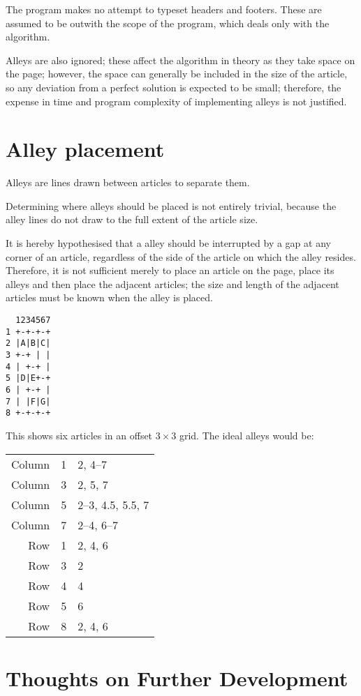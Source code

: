 \documentclass[a4paper]{scrartcl}
\begin{document}
The program makes no attempt to typeset headers and footers. These are
assumed to be outwith the scope of the program, which deals only with
the algorithm.

Alleys are also ignored; these affect the algorithm in theory as they
take space on the page; however, the space can generally be included
in the size of the article, so any deviation from a perfect solution is
expected to be small; therefore, the expense in time and program
complexity of implementing alleys is not justified.

\section*{Alley placement}

Alleys are lines drawn between articles to separate them.

Determining where alleys should be placed is not entirely trivial,
because the alley lines do not draw to the full extent of the article size.

It is hereby hypothesised that a alley should be interrupted by a gap
at any corner of an article, regardless of the side of the article on
which the alley resides. Therefore, it is not sufficient merely to
place an article on the page, place its alleys and then place the
adjacent articles; the size and length of the adjacent articles must
be known when the alley is placed.

\pagebreak[1]

\begin{verbatim}
  1234567
1 +-+-+-+
2 |A|B|C|
3 +-+ | |
4 | +-+ |
5 |D|E+-+
6 | +-+ |
7 | |F|G|
8 +-+-+-+
\end{verbatim}

This shows six articles in an offset $3\times 3$ grid.
The ideal alleys would be:

\begin{tabular}{r|c|l}
Column & 1 & 2, 4--7 \\
Column & 3 & 2, 5, 7 \\
Column & 5 & 2--3, 4.5, 5.5, 7 \\
Column & 7 & 2--4, 6--7 \\
Row & 1 & 2, 4, 6 \\
Row & 3 & 2 \\
Row & 4 & 4 \\
Row & 5 & 6 \\
Row & 8 & 2, 4, 6
\end{tabular}

\section*{Thoughts on Further Development}
\end{document}
